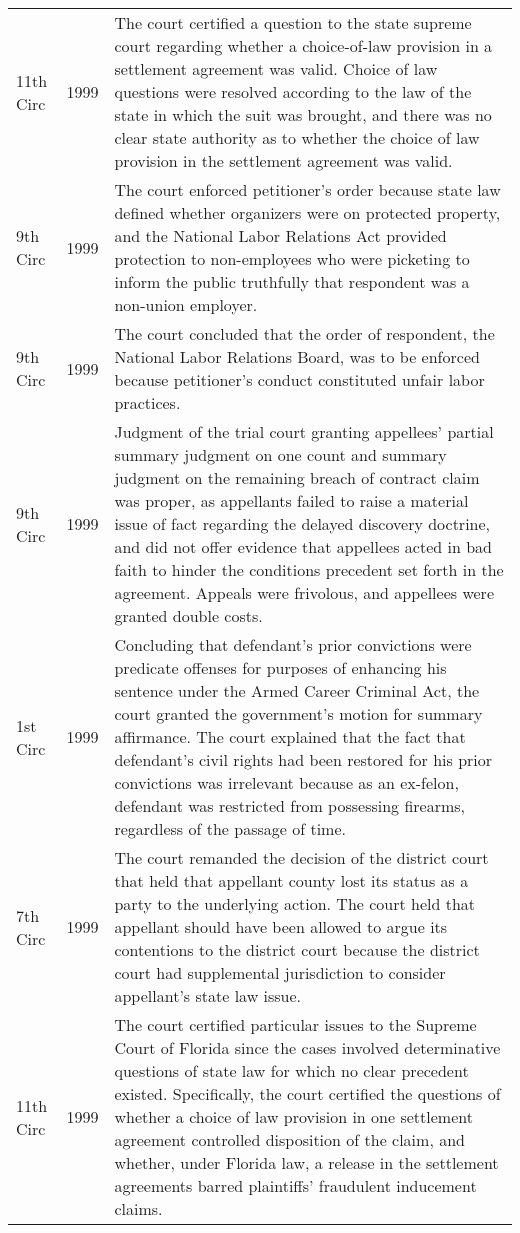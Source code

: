 \documentclass[10pt, letterpaper]{article}
\begin{document}
\begin{spacing}{1.0}
\begin{small}
\begin{longtable}[H]{llp{5in}}
    11th Circ & 1999 & The court certified a question to the state supreme court regarding whether a choice-of-law provision in a settlement agreement was valid. Choice of law questions were resolved according to the law of the state in which the suit was brought, and there was no clear state authority as to whether the choice of law provision in the settlement agreement was valid.\\[4pt]
    9th Circ & 1999 & The court enforced petitioner's order because state law defined whether organizers were on protected property, and the National Labor Relations Act provided protection to non-employees who were picketing to inform the public truthfully that respondent was a non-union employer.\\[4pt]
    9th Circ & 1999 & The court concluded that the order of respondent, the National Labor Relations Board, was to be enforced because petitioner's conduct constituted unfair labor practices.\\[4pt]
    9th Circ & 1999 & Judgment of the trial court granting appellees' partial summary judgment on one count and summary judgment on the remaining breach of contract claim was proper, as appellants failed to raise a material issue of fact regarding the delayed discovery doctrine, and did not offer evidence that appellees acted in bad faith to hinder the conditions precedent set forth in the agreement. Appeals were frivolous, and appellees were granted double costs.\\[4pt]
    1st Circ & 1999 & Concluding that defendant's prior convictions were predicate offenses for purposes of enhancing his sentence under the Armed Career Criminal Act, the court granted the government's motion for summary affirmance. The court explained that the fact that defendant's civil rights had been restored for his prior convictions was irrelevant because as an ex-felon, defendant was restricted from possessing firearms, regardless of the passage of time.\\[4pt]
    7th Circ & 1999 & The court remanded the decision of the district court that held that appellant county lost its status as a party to the underlying action. The court held that appellant should have been allowed to argue its contentions to the district court because the district court had supplemental jurisdiction to consider appellant's state law issue.\\[4pt]
    11th Circ & 1999 & The court certified particular issues to the Supreme Court of Florida since the cases involved determinative questions of state law for which no clear precedent existed. Specifically, the court certified the questions of whether a choice of law provision in one settlement agreement controlled disposition of the claim, and whether, under Florida law, a release in the settlement agreements barred plaintiffs' fraudulent inducement claims.\\[4pt]

\end{longtable}
\end{small}
\end{spacing}
\end{document}
